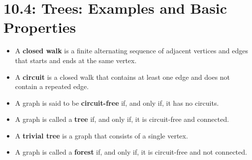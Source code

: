 \documentclass[../mathNotesPreamble]{subfiles}
\providecommand{\relscalefact}{1.4}
\begin{document}
\relscale{\relscalefact}
  \section{10.4: Trees: Examples and Basic Properties}

  \begin{defn*}
    \begin{itemize}
      \item A \textbf{closed walk} is a finite alternating sequence of adjacent vertices and edges that starts and ends at the same vertex.
      \item A \textbf{circuit} is a closed walk that contains at least one edge and does not contain a repeated edge.
      \item A graph is said to be \textbf{circuit-free} if, and only if, it has no circuits. 
      \item A graph is called a \textbf{tree} if, and only if, it is circuit-free and connected. 
      \item A \textbf{trivial tree} is a graph that consists of a single vertex. 
      \item A graph is called a \textbf{forest} if, and only if, it is circuit-free and not connected.
    \end{itemize}
  \end{defn*}
\end{document}
